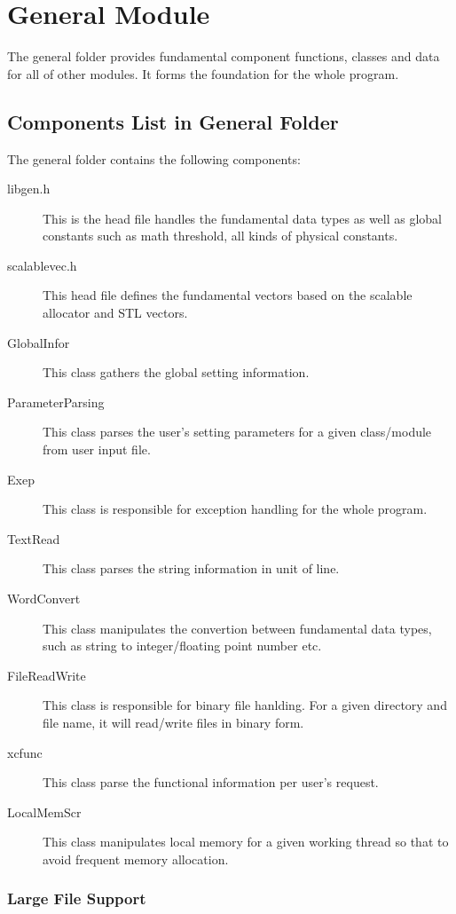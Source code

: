 %
%
\chapter{General Module}
%
%
%
The general folder provides fundamental component functions, classes and 
data for all of other modules. It forms the foundation for the whole 
program.

\section{Components List in General Folder}

The general folder contains the following components:
\begin{description}
 \item [libgen.h] This is the head file handles the fundamental data types
 as well as global constants such as math threshold, all kinds of physical
 constants.
 \item [scalablevec.h] This head file defines the fundamental vectors based 
 on the scalable allocator and STL vectors.
 \item [GlobalInfor] This class gathers the global setting information.
 \item [ParameterParsing] This class parses the user's setting parameters 
 for a given class/module from user input file.
 \item [Exep] This class is responsible for exception handling for the whole
 program.
 \item [TextRead] This class parses the string information in unit of line.
 \item [WordConvert] This class manipulates the convertion between fundamental
 data types, such as string to integer/floating point number etc.
 \item [FileReadWrite] This class is responsible for binary file hanlding. 
 For a given directory and file name, it will read/write files in binary form.
 \item [xcfunc] This class parse the functional information per user's request.
 \item [LocalMemScr] This class manipulates local memory for a given working
 thread so that to avoid frequent memory allocation.
\end{description}

\subsection{Large File Support}

